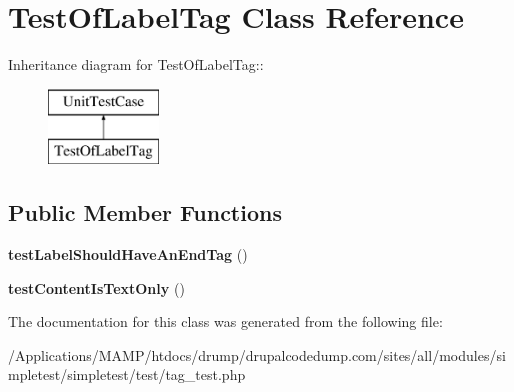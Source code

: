 \hypertarget{class_test_of_label_tag}{
\section{TestOfLabelTag Class Reference}
\label{class_test_of_label_tag}
}
Inheritance diagram for TestOfLabelTag::\begin{figure}[H]
\begin{center}
\leavevmode
\includegraphics[height=2cm]{class_test_of_label_tag}
\end{center}
\end{figure}
\subsection*{Public Member Functions}
\begin{DoxyCompactItemize}
\item 
\hypertarget{class_test_of_label_tag_adce4a4c037d8b2e9c1e1935471b36f28}{
{\bfseries testLabelShouldHaveAnEndTag} ()}
\label{class_test_of_label_tag_adce4a4c037d8b2e9c1e1935471b36f28}

\item 
\hypertarget{class_test_of_label_tag_ae0859f20b49f4a9e48fb7bea39018c10}{
{\bfseries testContentIsTextOnly} ()}
\label{class_test_of_label_tag_ae0859f20b49f4a9e48fb7bea39018c10}

\end{DoxyCompactItemize}


The documentation for this class was generated from the following file:\begin{DoxyCompactItemize}
\item 
/Applications/MAMP/htdocs/drump/drupalcodedump.com/sites/all/modules/simpletest/simpletest/test/tag\_\-test.php\end{DoxyCompactItemize}
